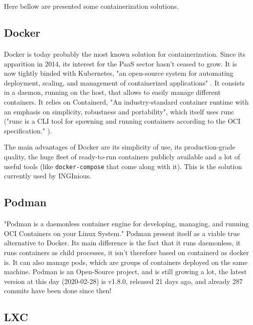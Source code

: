 Here bellow are presented some containerization solutions.

\subsection{Docker}
\paragraph{}Docker\cite{merkel2014docker} is today probably the most known solution for containerization.  Since its apparition in 2014, its interest for the PaaS sector hasn't ceased to grow.  It is now tightly binded with Kubernetes, "an open-source system for automating deployment, scaling, and management of containerized applications" \cite{kubernetes}.  It consists in a daemon, running on the host, that allows to easily manage different containers.  It relies on Containerd, "An industry-standard container runtime with an emphasis on simplicity, robustness and portability"\cite{containerd}, which itself uses runc ("runc is a CLI tool for spawning and running containers according to the OCI specification." \cite{runc}).

The main advantages of Docker are its simplicity of use, its production-grade quality, the huge fleet of ready-to-run containers publicly available and a lot of useful tools (like \texttt{docker-compose} that come along with it).  This is the solution currently used by INGInious.

\subsection{Podman}
\paragraph{}"Podman is a daemonless container engine for developing, managing, and running OCI\cite{oci} Containers on your Linux System."\cite{podman}  Podman present itself as a viable true alternative to Docker.  Its main difference is the fact that it runs daemonless, it runs containers as child processes, it isn't therefore based on containerd as docker is.  It can also manage pods, which are groups of containers deployed on the same machine.  Podman is an Open-Source project, and is still growing a lot, the latest version at this day (2020-02-28) is v1.8.0, released 21 days ago, and already 287 commits have been done since then!

\subsection{LXC}
